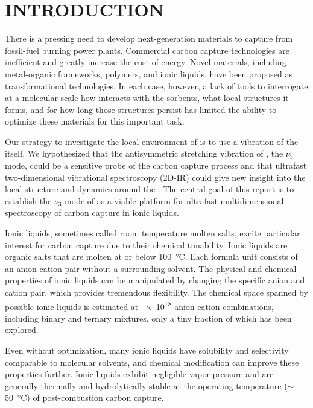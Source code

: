 \section{INTRODUCTION}
There is a pressing need to develop next-generation materials to capture  from fossil-fuel burning power plants. Commercial carbon capture technologies are inefficient and greatly increase the cost of energy\cite{Bhown2011}. Novel materials, including metal-organic frameworks,\cite{millwardJACS-05,sumidaCR-12} polymers,\cite{Du2011,Dawson2011} and ionic liquids,\cite{batesJACS-02,Karadas2010,baraACR-10} have been proposed as transformational technologies. In each case, however, a lack of tools to interrogate at a molecular scale how  interacts with the sorbents, what local structures it forms, and for how long those structures persist has limited the ability to optimize these materials for this important task.
 
Our strategy to investigate the local environment of  is to use a vibration of the  itself. We hypothesized that the antisymmetric stretching vibration of , the $\nu_3$ mode, could be a sensitive probe of the carbon capture process and that ultrafast two-dimensional vibrational spectroscopy (2D-IR) could give new insight into the local structure and dynamics around the . The central goal of this report is to establish the ${\nu}_3$ mode of  as a viable platform for ultrafast multidimensional spectroscopy of carbon capture in ionic liquids.

Ionic liquids, sometimes called room temperature molten salts, excite particular interest for carbon capture due to their chemical tunability. Ionic liquids are organic salts that are molten at or below \SI{100}{\celsius}. Each formula unit consists of an anion-cation pair without a surrounding solvent. The physical and chemical properties of ionic liquids can be manipulated by changing the specific anion and cation pair, which provides tremendous flexibility. The chemical space spanned by possible ionic liquids is estimated at \num{e18} anion-cation combinations, including binary and ternary mixtures,\cite{Holbrey1999} only a tiny fraction of which has been explored.

Even without optimization, many ionic liquids have  solubility and selectivity comparable to molecular solvents,\cite{Bara2009,Cadena2004} and chemical modification can improve these properties further.\cite{Gurkan2010,seoJPCB-14} Ionic liquids exhibit negligible vapor pressure and are generally thermally and hydrolytically stable at the operating temperature ($\sim$\SI{50}{\celsius}) of post-combustion carbon capture.

